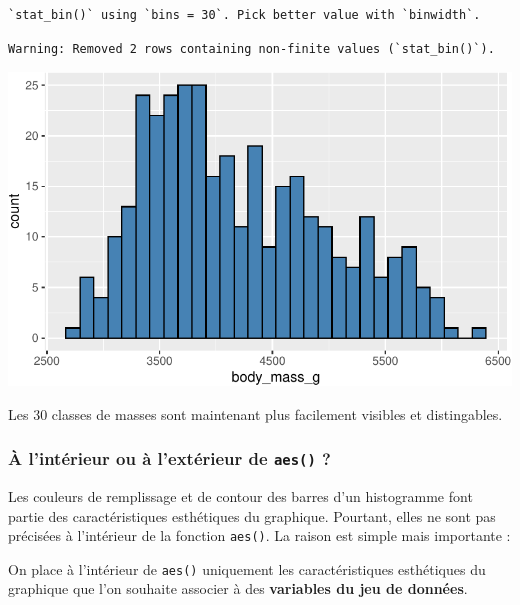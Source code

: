\documentclass[
  a4paper,
  DIV=11,
  numbers=noendperiod,
  oneside]{scrreprt}
\begin{document}
\begin{verbatim}
`stat_bin()` using `bins = 30`. Pick better value with `binwidth`.
\end{verbatim}

\begin{verbatim}
Warning: Removed 2 rows containing non-finite values (`stat_bin()`).
\end{verbatim}

\includegraphics{03-visualization_files/figure-pdf/unnamed-chunk-10-1.pdf}

Les 30 classes de masses sont maintenant plus facilement visibles et
distingables.

\subsubsection{\texorpdfstring{À l'intérieur ou à l'extérieur de
\texttt{aes()}
?}{À l'intérieur ou à l'extérieur de aes() ?}}\label{uxe0-lintuxe9rieur-ou-uxe0-lextuxe9rieur-de-aes}

Les couleurs de remplissage et de contour des barres d'un histogramme
font partie des caractéristiques esthétiques du graphique. Pourtant,
elles ne sont pas précisées à l'intérieur de la fonction \texttt{aes()}.
La raison est simple mais importante :

\begin{tcolorbox}[enhanced jigsaw, arc=.35mm, opacityback=0, colbacktitle=quarto-callout-important-color!10!white, bottomrule=.15mm, coltitle=black, colframe=quarto-callout-important-color-frame, breakable, toprule=.15mm, title=\textcolor{quarto-callout-important-color}{\faExclamation}\hspace{0.5em}{Important}, leftrule=.75mm, titlerule=0mm, bottomtitle=1mm, toptitle=1mm, left=2mm, rightrule=.15mm, opacitybacktitle=0.6, colback=white]

On place à l'intérieur de \texttt{aes()} uniquement les caractéristiques
esthétiques du graphique que l'on souhaite associer à des
\textbf{variables du jeu de données}.

\end{tcolorbox}
\end{document}
